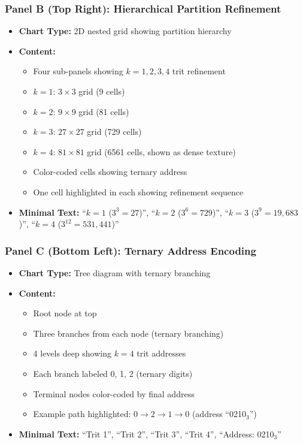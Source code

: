 \subsubsection*{Panel B (Top Right): Hierarchical Partition Refinement}
\begin{itemize}
\item \textbf{Chart Type:} 2D nested grid showing partition hierarchy
\item \textbf{Content:}
  \begin{itemize}
  \item Four sub-panels showing $k = 1, 2, 3, 4$ trit refinement
  \item $k=1$: $3 \times 3$ grid (9 cells)
  \item $k=2$: $9 \times 9$ grid (81 cells)
  \item $k=3$: $27 \times 27$ grid (729 cells)
  \item $k=4$: $81 \times 81$ grid (6561 cells, shown as dense texture)
  \item Color-coded cells showing ternary address
  \item One cell highlighted in each showing refinement sequence
  \end{itemize}
\item \textbf{Minimal Text:} ``$k=1$ ($3^3=27$)'', ``$k=2$ ($3^6=729$)'', ``$k=3$ ($3^9=19{,}683$)'', ``$k=4$ ($3^{12}=531{,}441$)''
\end{itemize}

\subsubsection*{Panel C (Bottom Left): Ternary Address Encoding}
\begin{itemize}
\item \textbf{Chart Type:} Tree diagram with ternary branching
\item \textbf{Content:}
  \begin{itemize}
  \item Root node at top
  \item Three branches from each node (ternary branching)
  \item 4 levels deep showing $k=4$ trit addresses
  \item Each branch labeled 0, 1, 2 (ternary digits)
  \item Terminal nodes color-coded by final address
  \item Example path highlighted: $0 \to 2 \to 1 \to 0$ (address ``0210$_3$'')
  \end{itemize}
\item \textbf{Minimal Text:} ``Trit 1'', ``Trit 2'', ``Trit 3'', ``Trit 4'', ``Address: 0210$_3$''
\end{itemize}

